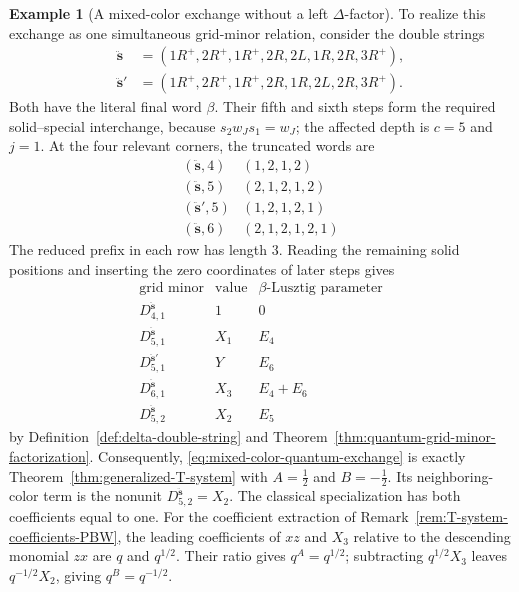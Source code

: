 \documentclass[12pt, reqno]{amsart}
\theoremstyle{plain}
\theoremstyle{definition}
\newtheorem{example}[theorem]{Example}
\numberwithin{equation}{section}
\begin{document}
\begin{example}[A mixed-color exchange without a left \(\Delta\)-factor]
To realize this exchange as one simultaneous grid-minor relation,
consider the double strings
\[
\begin{aligned}
 \ddot{\mathbf s}
  &=(1R^+,2R^+,1R^+,2R,2L,1R,2R,3R^+),\\
 \ddot{\mathbf s}'
  &=(1R^+,2R^+,1R^+,2R,1R,2L,2R,3R^+).
\end{aligned}
\]
Both have the literal final word \(\beta\). Their fifth and sixth
steps form the required solid--special interchange, because
\(s_2w_Js_1=w_J\); the affected depth is \(c=5\) and
\(j=1\). At the four relevant corners, the truncated words are
\[
\begin{array}{c|c}
 (\ddot{\mathbf s},4)&(1,2,1,2)\\
 (\ddot{\mathbf s},5)&(2,1,2,1,2)\\
 (\ddot{\mathbf s}',5)&(1,2,1,2,1)\\
 (\ddot{\mathbf s},6)&(2,1,2,1,2,1)
\end{array}
\]
The reduced prefix in each row has length \(3\). Reading the
remaining solid positions and inserting the zero coordinates of
later steps gives
\[
\begin{array}{c|c|c}
 \text{grid minor}&\text{value}&\beta\text{-Lusztig parameter}
 \\ \hline
 D_{4,1}^{\ddot{\mathbf s}}&1&0\\
 D_{5,1}^{\ddot{\mathbf s}}&X_1&E_4\\
 D_{5,1}^{\ddot{\mathbf s}'}&Y&E_6\\
 D_{6,1}^{\ddot{\mathbf s}}&X_3&E_4+E_6\\
 D_{5,2}^{\ddot{\mathbf s}}&X_2&E_5
\end{array}
\]
by Definition~\ref{def:delta-double-string} and
Theorem~\ref{thm:quantum-grid-minor-factorization}.
Consequently, \eqref{eq:mixed-color-quantum-exchange} is exactly
Theorem~\ref{thm:generalized-T-system} with
\(A=\tfrac12\) and \(B=-\tfrac12\). Its neighboring-color
term is the nonunit \(D_{5,2}^{\ddot{\mathbf s}}=X_2\).
The classical specialization has both coefficients equal to one.
For the coefficient extraction of Remark~\ref{rem:T-system-coefficients-PBW},
the leading coefficients of \(xz\) and \(X_3\) relative to the
descending monomial \(zx\) are \(q\) and \(q^{1/2}\). Their
ratio gives \(q^A=q^{1/2}\); subtracting \(q^{1/2}X_3\)
leaves \(q^{-1/2}X_2\), giving \(q^B=q^{-1/2}\).


\end{example}
\end{document}
